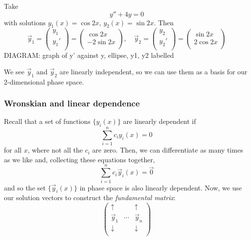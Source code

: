 \documentclass{../../template/note}
\begin{document}
    \begin{example}
        Take
        \[
            y'' + 4y = 0
        \]
        with solutions \(y_1(x) = \cos 2x\), \(y_2(x) = \sin 2x\). Then
        \[
            \vec y_1 = \begin{pmatrix}
             y_1 \\
             y_1' \\
            \end{pmatrix} = \begin{pmatrix}
             \cos 2x \\
             -2 \sin 2x \\
            \end{pmatrix}, \quad
            \vec y_2 = \begin{pmatrix}
             y_2 \\
             y_2' \\
            \end{pmatrix} = \begin{pmatrix}
             \sin 2x \\
             2 \cos 2x \\
            \end{pmatrix}
        \]
        DIAGRAM: graph of y' against y, ellipse, y1, y2 labelled

        We see \(\vec y_1\) and \(\vec y_2\) are linearly independent, so we can use them as a basis for our 2-dimensional phase space.
    \end{example}
    
    \subsubsection{Wronskian and linear dependence}

    Recall that a set of functions \(\{y_i(x)\}\) are linearly dependent if
    \[
        \sum_{i=1}^n c_i y_i(x) = 0
    \]
    for all \(x\), where not all the \(c_i\) are zero. Then, we can differentiate as many times as we like and, collecting these equations together,
    \[
        \sum_{i=1}^n c_i \vec y_i(x) = \vec 0
    \]
    and so the set \(\{\vec y_i(x)\}\) in phase space is also linearly dependent. Now, we use our solution vectors to construct the \emph{fundamental matrix}:
    \[
        \begin{pmatrix}
         \uparrow &  & \uparrow \\
         \vec y_1 & \cdots & \vec y_n \\
         \downarrow &  & \downarrow \\
        \end{pmatrix}
    \]
    
\end{document}
